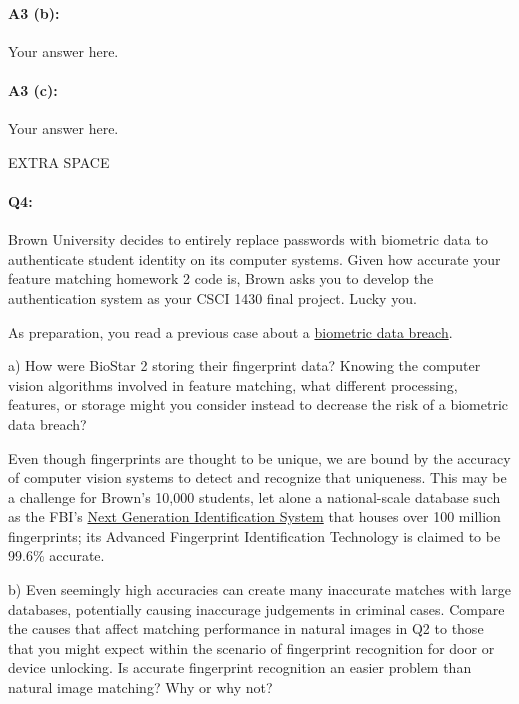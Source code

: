 \paragraph{A3 (b):} Your answer here.

\paragraph{A3 (c):} Your answer here.
\pagebreak


EXTRA SPACE
\pagebreak


\paragraph{Q4:} Brown University decides to entirely replace passwords with biometric data to authenticate student identity on its computer systems. Given how accurate your feature matching homework 2 code is, Brown asks you to develop the authentication system as your CSCI 1430 final project. Lucky you.

As preparation, you read a previous case about a \href{https://www.vpnmentor.com/blog/report-biostar2-leak/}{biometric data breach}.

a) How were BioStar 2 storing their fingerprint data? Knowing the computer vision algorithms involved in feature matching, what different processing, features, or storage might you consider instead to decrease the risk of a biometric data breach?

Even though fingerprints are thought to be unique, we are bound by the accuracy of computer vision systems to detect and recognize that uniqueness.
This may be a challenge for Brown's 10,000 students, let alone a national-scale database such as the FBI's \href{https://www.fbi.gov/services/cjis/fingerprints-and-other-biometrics/ngi}{Next Generation Identification System} that houses over 100 million fingerprints; its Advanced Fingerprint Identification Technology is claimed to be 99.6\% accurate.

b) Even seemingly high accuracies can create many inaccurate matches with large databases, potentially causing inaccurage judgements in criminal cases. Compare the causes that affect matching performance in natural images in Q2 to those that you might expect within the scenario of fingerprint recognition for door or device unlocking. Is accurate fingerprint recognition an easier problem than natural image matching? Why or why not?

